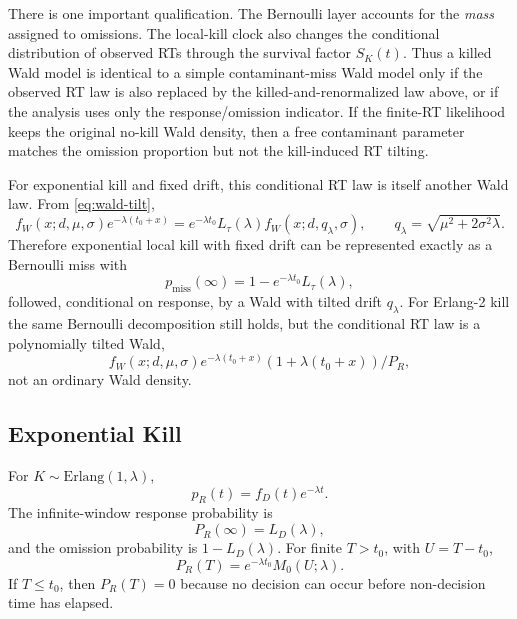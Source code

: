 \documentclass[12pt]{article}
\begin{document}
There is one important qualification. The Bernoulli layer accounts for the \emph{mass} assigned to omissions. The local-kill clock also changes the conditional distribution of observed RTs through the survival factor $S_K(t)$. Thus a killed Wald model is identical to a simple contaminant-miss Wald model only if the observed RT law is also replaced by the killed-and-renormalized law above, or if the analysis uses only the response/omission indicator. If the finite-RT likelihood keeps the original no-kill Wald density, then a free contaminant parameter matches the omission proportion but not the kill-induced RT tilting.

For exponential kill and fixed drift, this conditional RT law is itself another Wald law. From \eqref{eq:wald-tilt},
\begin{equation}
  f_W(x;d,\mu,\sigma)e^{-\lambda(t_0+x)}
  =e^{-\lambda t_0}L_\tau(\lambda)f_W(x;d,q_\lambda,\sigma),
  \qquad
  q_\lambda=\sqrt{\mu^2+2\sigma^2\lambda}.
\end{equation}
Therefore exponential local kill with fixed drift can be represented exactly as a Bernoulli miss with
\[
  p_{\mathrm{miss}}(\infty)=1-e^{-\lambda t_0}L_\tau(\lambda),
\]
followed, conditional on response, by a Wald with tilted drift $q_\lambda$. For Erlang-2 kill the same Bernoulli decomposition still holds, but the conditional RT law is a polynomially tilted Wald,
\[
  f_W(x;d,\mu,\sigma)e^{-\lambda(t_0+x)}(1+\lambda(t_0+x))/P_R,
\]
not an ordinary Wald density.

\subsection{Exponential Kill}
For $K\sim\mathrm{Erlang}(1,\lambda)$,
\begin{equation}
  p_R(t)=f_D(t)e^{-\lambda t}.
\end{equation}
The infinite-window response probability is
\begin{equation}
  P_R(\infty)=L_D(\lambda),
\end{equation}
and the omission probability is $1-L_D(\lambda)$. For finite $T>t_0$, with $U=T-t_0$,
\begin{equation}
  P_R(T)=e^{-\lambda t_0}M_0(U;\lambda).
  \label{eq:exp-kill-window}
\end{equation}
If $T\le t_0$, then $P_R(T)=0$ because no decision can occur before non-decision time has elapsed.
\end{document}
